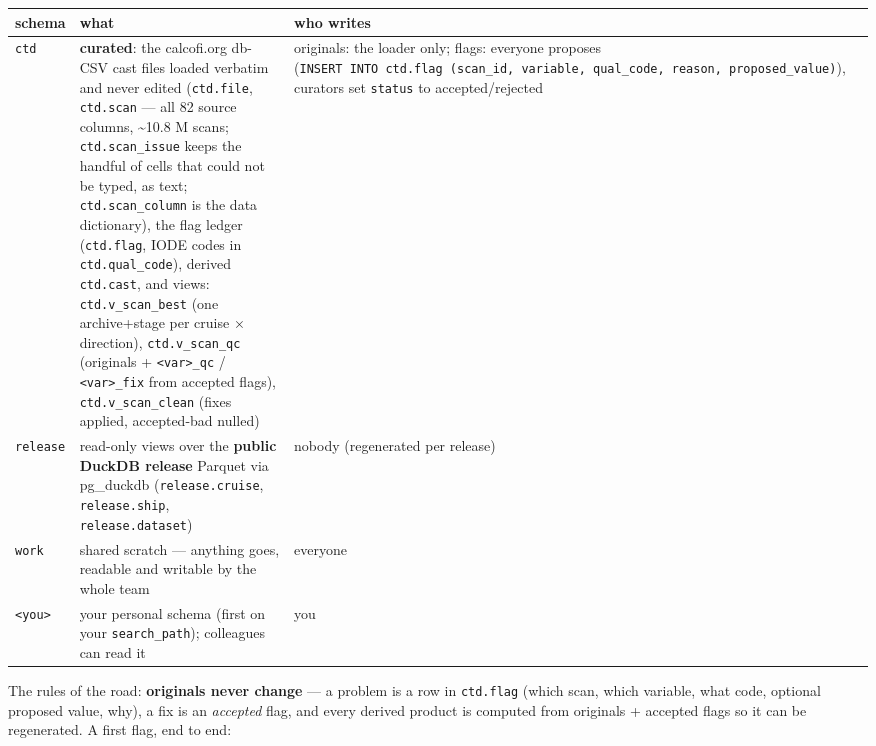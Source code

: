 \documentclass[
  letterpaper,
  DIV=11,
  numbers=noendperiod]{scrreprt}
\begin{document}
\begin{longtable}[]{@{}
  >{\raggedright\arraybackslash}p{}
  >{\raggedright\arraybackslash}p{}
  >{\raggedright\arraybackslash}p{}@{}}
\toprule\noalign{}
\begin{minipage}[b]{\linewidth}\raggedright
schema
\end{minipage} & \begin{minipage}[b]{\linewidth}\raggedright
what
\end{minipage} & \begin{minipage}[b]{\linewidth}\raggedright
who writes
\end{minipage} \\
\midrule\noalign{}
\endhead
\bottomrule\noalign{}
\endlastfoot
\texttt{ctd} & \textbf{curated}: the calcofi.org db-CSV cast files
loaded verbatim and never edited (\texttt{ctd.file}, \texttt{ctd.scan}
--- all 82 source columns, \textasciitilde10.8 M scans;
\texttt{ctd.scan\_issue} keeps the handful of cells that could not be
typed, as text; \texttt{ctd.scan\_column} is the data dictionary), the
flag ledger (\texttt{ctd.flag}, IODE codes in \texttt{ctd.qual\_code}),
derived \texttt{ctd.cast}, and views: \texttt{ctd.v\_scan\_best} (one
archive+stage per cruise × direction), \texttt{ctd.v\_scan\_qc}
(originals + \texttt{\textless{}var\textgreater{}\_qc} /
\texttt{\textless{}var\textgreater{}\_fix} from accepted flags),
\texttt{ctd.v\_scan\_clean} (fixes applied, accepted-bad nulled) &
originals: the loader only; flags: everyone proposes
(\texttt{INSERT\ INTO\ ctd.flag\ (scan\_id,\ variable,\ qual\_code,\ reason,\ proposed\_value)}),
curators set \texttt{status} to accepted/rejected \\
\texttt{release} & read-only views over the \textbf{public DuckDB
release} Parquet via pg\_duckdb (\texttt{release.cruise},
\texttt{release.ship}, \texttt{release.dataset}) & nobody (regenerated
per release) \\
\texttt{work} & shared scratch --- anything goes, readable and writable
by the whole team & everyone \\
\texttt{\textless{}you\textgreater{}} & your personal schema (first on
your \texttt{search\_path}); colleagues can read it & you \\
\end{longtable}

The rules of the road: \textbf{originals never change} --- a problem is
a row in \texttt{ctd.flag} (which scan, which variable, what code,
optional proposed value, why), a fix is an \emph{accepted} flag, and
every derived product is computed from originals + accepted flags so it
can be regenerated. A first flag, end to end:
\end{document}
